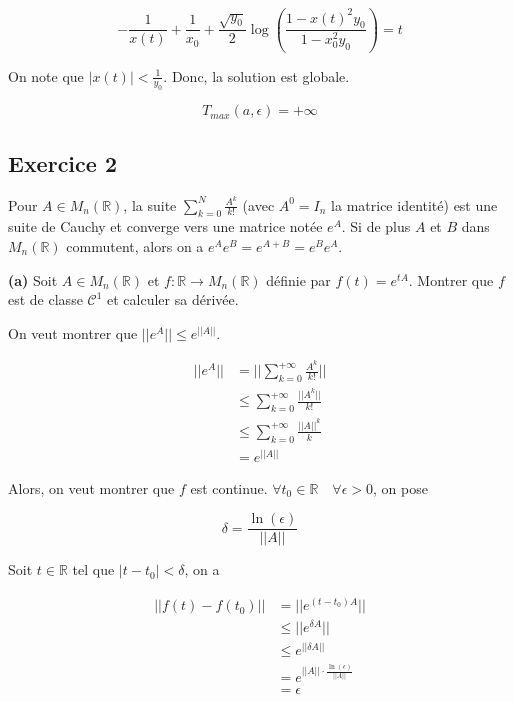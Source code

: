 \documentclass[french]{article}
\begin{document}
		\[-\frac{1}{x(t)} + \frac{1}{x_0} + \frac{\sqrt{y_0}}{2}\log\left(\frac{1 - x(t)^2y_0}{1-x_0^2y_0}\right) = t\]
	
	On note que $|x(t)| < \frac{1}{y_0}$. Donc, la solution est globale.
	
	\[T_{max}(a, \epsilon) = + \infty\]


	\subsection*{Exercice 2}
	
	\begin{tcolorbox}[colback=red!5!white,colframe=red!75!black]
		Pour $A \in M_n(\mathbb{R})$, la suite $\sum_{k=0}^{N} \frac{A^k}{k!}$ (avec $A^0 = I_n$ la matrice identité) est une suite de Cauchy et converge vers une matrice notée $e^A$. Si de plus $A$ et $B$ dans $M_n(\mathbb{R})$ commutent, alors on a $e^Ae^B = e^{A+B} = e^Be^A$.
	\end{tcolorbox}

	\begin{tcolorbox}[colback=gray!5!white,colframe=gray!75!black]
		\textbf{\large{(a)}} Soit $A \in M_n(\mathbb{R})$ et $f:\mathbb{R} \to M_n(\mathbb{R})$ définie par $f(t) = e^{tA}$. Montrer que $f$ est de classe $\mathcal{C}^1$ et calculer sa dérivée. 
	\end{tcolorbox}
	
	On veut montrer que $||e^{A}|| \leq e^{ ||A||}$.
	
	\begin{align}
		||e^A|| &= || \sum_{k=0}^{+\infty} \frac{A^k}{k!}||\\
		&\leq \sum_{k=0}^{+\infty} \frac{||A^k||}{k!}\\
		&\leq \sum_{k=0}^{+\infty} \frac{||A||^k}{k}\\
		&= e^{||A||}
	\end{align}
	
	Alors, on veut montrer que $f$ est continue. $\forall t_0 \in \mathbb{R} \quad \forall \epsilon > 0$, on pose 
	
	\[\delta = \frac{\ln(\epsilon)}{||A||}\]
	
	Soit $t \in \mathbb{R}$ tel que $| t - t_0 | < \delta$, on a
	
	\begin{align}
		|| f(t) - f(t_0)|| &= || e^{(t-t_0)A}||\\
		&\leq ||e^{\delta A}||\\
		&\leq e^{|| \delta A||}\\
		&= e^{||A|| \cdot \frac{\ln(\epsilon)}{||A||}}\\
		&= \epsilon
	\end{align}
	
\end{document}
